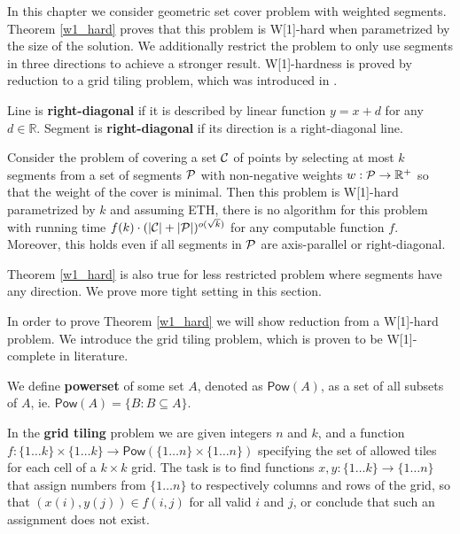 In this chapter we consider geometric set cover problem with weighted segments.
Theorem \ref{w1_hard} proves that this problem is 
W[1]-hard when parametrized by the size of the solution.
We additionally restrict the problem to only use segments
in three directions to achieve a stronger result.
W[1]-hardness is proved by reduction to a grid tiling problem,
which was introduced in \cite{marx_grid_tiling}.

\begin{defi}
	Line is \textbf{right-diagonal} if it is
	described by linear function $y = x + d$ for any $d \in \mathbb{R}$.
	Segment is \textbf{right-diagonal} if its
	direction is a right-diagonal line.
\end{defi}

\begin{tw}
\label{w1_hard}
	Consider the problem of covering a set $\mathcal{C}$ of points
	by selecting at most $k$ segments
	from a set of segments $\mathcal{P}$ 
	with non-negative weights $w : \mathcal{P} \rightarrow \mathbb{R^+}$
	so that the weight of the cover is minimal.
	Then this problem is W[1]-hard parametrized by $k$ and
	assuming ETH, there is no algorithm for this
	problem with running time
	$f(k)\cdot(|\mathcal{C}| + |\mathcal{P}|)^{o(\sqrt{k})}$
	for any computable function $f$.
	Moreover, this holds even if all segments in $\mathcal{P}$
	are axis-parallel or right-diagonal.
\end{tw}

Theorem \ref{w1_hard} is also true for less
restricted problem where segments have any direction.
We prove more tight setting in this section.

In order to prove Theorem \ref{w1_hard}
we will show reduction from a W[1]-hard problem.
We introduce the grid tiling problem, which is proven
to be W[1]-complete in literature.

\newcommand{\pow}{\mathsf{Pow}}

\begin{defi}
We define \textbf{powerset} of some set $A$, denoted as $\pow(A)$,
as a set of all subsets of $A$, ie. $\pow(A) = \{B : B \subseteq A\}$.
\end{defi}

\begin{defi}
In the \textbf{grid tiling} problem we are given integers $n$ and $k$,
and a function
$f : \{1 \ldots k\} \times \{1 \ldots k\} \rightarrow \pow(\{1 \ldots n\} \times \{1 \ldots n\})$
specifying the set of allowed tiles for each cell of a $k \times k$ grid.
The task is to find functions
$x,y : \{1 \ldots k\} \rightarrow \{1 \ldots n\}$
that assign numbers from $\{1 \ldots n\}$
to respectively columns and rows of the grid,
so that $(x(i), y(j)) \in f(i, j)$ for all valid $i$ and $j$,
or conclude that such an assignment does not exist.
\end{defi}

